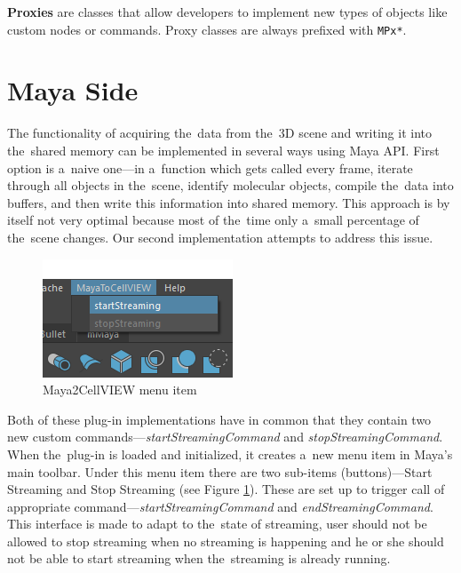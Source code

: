 \documentclass[
  digital, %
  table,   %
  nolof,     %
  nolot,     %
  oneside,
]{fithesis3}
\begin{document}
\textbf{Proxies} are classes that allow developers to implement new types of objects like custom nodes or commands. Proxy classes are always prefixed with \texttt{MPx*}.

\section{Maya Side}
The functionality of acquiring the data from the 3D scene and writing it into the shared memory can be implemented in several ways using Maya API.
First option is a naive one—in a function which gets called every frame, iterate through all objects in the scene, identify molecular objects, compile the data into buffers, and then write this information into shared memory.
This approach is by itself not very optimal because most of the time only a small percentage of the scene changes. Our second implementation attempts to address this issue.

\begin{figure}
  \centering
  \includegraphics{images/maya-to-unity-menu.png}
  \caption{Maya2CellVIEW menu item}
  \label{fig:maya-menu-item}
\end{figure}

Both of these plug-in implementations have in common that they contain two new custom commands—\textit{startStreamingCommand} and \textit{stopStreamingCommand}. When the plug-in is loaded and initialized, it creates a new menu item in Maya's main toolbar. Under this menu item there are two sub-items (buttons)—Start Streaming and Stop Streaming (see Figure \ref{fig:maya-menu-item}). These are set up to trigger call of appropriate command—\textit{startStreamingCommand} and \textit{endStreamingCommand}. This interface is made to adapt to the state of streaming, user should not be allowed to stop streaming when no streaming is happening and he or she should not be able to start streaming when the streaming is already running.
\end{document}
